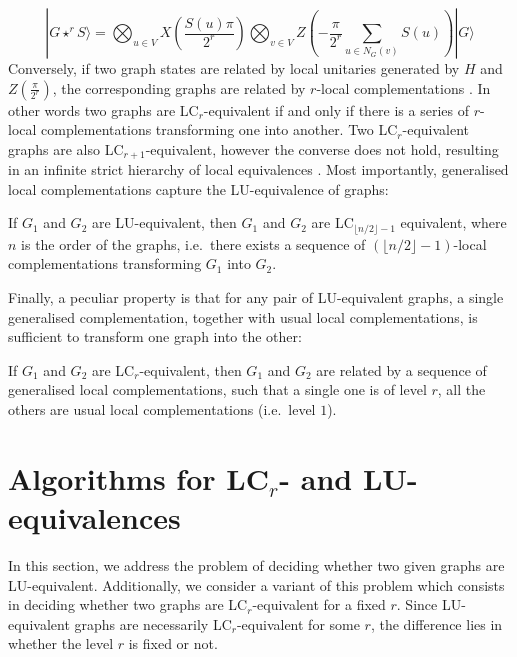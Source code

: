\documentclass[a4paper,UKenglish,cleveref,autoref,thm-restate]{arxiv}
\newcommand{\ket}[1]{  |{#1} \rangle} \newcommand{\bra}[1]{ \left \langle#1\right | }
\begin{document}
$$\ket{G\star^r S} = \bigotimes_{u\in V}X\left(\frac {S(u)\pi}{2^r}\right)\bigotimes_{v\in V}Z\left(-\frac {\pi}{2^r}\sum_{u \in N_G(v)}S(u)\right)\ket{G}$$
Conversely, if two graph states are related by local unitaries generated by $H$ and $Z\left(\frac \pi {2^r}\right)$, the corresponding graphs are related by $r$-local complementations \cite{claudet2024local}. In other words two graphs are LC$_r$-equivalent if and only if there is a series of $r$-local complementations transforming one into another. Two LC$_r$-equivalent graphs are also LC$_{r+1}$-equivalent, however the converse does not hold, resulting in an infinite strict hierarchy of local equivalences \cite{claudet2024local}. 
Most importantly, generalised local complementations capture the LU-equivalence of graphs:

\begin{theorem}{\bf \cite{claudet2024local}}\label{thm:LU_imply_LCr}
    If $G_1$ and $G_2$ are LU-equivalent, then $G_1$ and $G_2$ are LC$_{\lfloor n/2 \rfloor-1}$ equivalent, where $n$ is the order of the graphs, i.e.~there exists a sequence of $({\lfloor n/2 \rfloor-1})$-local complementations transforming $G_1$ into $G_2$.
\end{theorem}

Finally, a peculiar property is that for any pair of LU-equivalent graphs, a single generalised complementation, together with usual local complementations, is sufficient to transform one graph into the other:

\begin{proposition}{\bf \cite{claudet2024local}} \label{prop:LCr_lc}
 If $G_1$ and $G_2$ are LC$_r$-equivalent, then $G_1$ and $G_2$ are related by a sequence of generalised local complementations, such that a single one is of level $r$, all the others are usual local complementations (i.e.~level $1$).

\end{proposition}


\section{Algorithms for LC$_r$- and LU-equivalences}


In this section, we address the problem of deciding whether two given graphs are LU-equivalent. Additionally, we  consider a variant of this problem which consists in deciding whether two graphs are LC$_r$-equivalent for a fixed $r$.  Since LU-equivalent graphs are necessarily LC$_r$-equivalent for some $r$, the difference lies in whether the level $r$ is fixed or not. 
\end{document}
